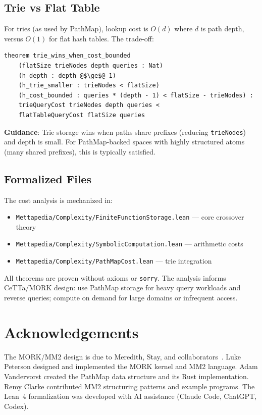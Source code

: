 \documentclass[11pt]{article}
\theoremstyle{definition}
\theoremstyle{remark}
\newcommand{\MORK}{\textup{MORK}}
\newcommand{\PathMap}{\textup{PathMap}}
\begin{document}
\subsection{Trie vs Flat Table}

For tries (as used by \PathMap{}), lookup cost is $O(d)$ where $d$ is path depth,
versus $O(1)$ for flat hash tables.  The trade-off:

\begin{lstlisting}
theorem trie_wins_when_cost_bounded
    (flatSize trieNodes depth queries : Nat)
    (h_depth : depth @$\ge$@ 1)
    (h_trie_smaller : trieNodes < flatSize)
    (h_cost_bounded : queries * (depth - 1) < flatSize - trieNodes) :
    trieQueryCost trieNodes depth queries <
    flatTableQueryCost flatSize queries
\end{lstlisting}

\noindent
\textbf{Guidance}: Trie storage wins when paths share prefixes (reducing
\texttt{trieNodes}) and depth is small.  For \PathMap{}-backed spaces with
highly structured atoms (many shared prefixes), this is typically satisfied.

\subsection{Formalized Files}

The cost analysis is mechanized in:
\begin{itemize}
  \item \texttt{Mettapedia/Complexity/FiniteFunctionStorage.lean} --- core crossover theory
  \item \texttt{Mettapedia/Complexity/SymbolicComputation.lean} --- arithmetic costs
  \item \texttt{Mettapedia/Complexity/PathMapCost.lean} --- trie integration
\end{itemize}

\noindent
All theorems are proven without axioms or \texttt{sorry}.  The analysis
informs CeTTa/\MORK{} design: use \PathMap{} storage for heavy query
workloads and reverse queries; compute on demand for large domains
or infrequent access.

\section*{Acknowledgements}

The \MORK{}/MM2 design is due to Meredith, Stay, and
collaborators~\cite{MeredithStayOSLF2020}.
Luke Peterson designed and implemented the \MORK{} kernel and MM2 language.
Adam Vandervorst created the \PathMap{} data structure and its Rust
implementation.
Remy Clarke contributed MM2 structuring patterns and example programs.
The Lean~4 formalization was developed with AI assistance (Claude Code,
ChatGPT, Codex).
\end{document}
